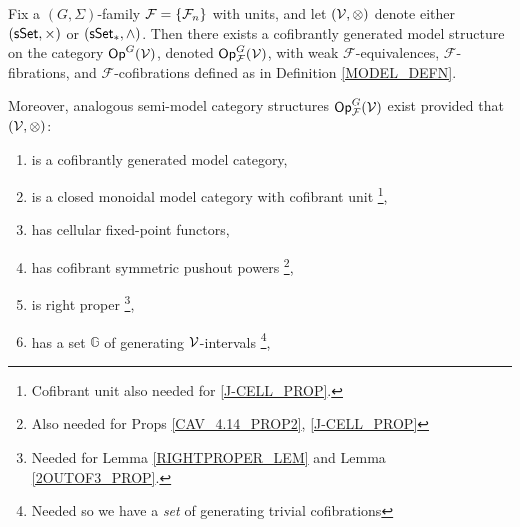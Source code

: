 \documentclass[a4paper,10pt
,draft
]{article}%
\renewcommand{\F}{\mathcal F}
\renewcommand{\1}{\eta}%
\begin{document}
\begin{theorem}
      \label{MODEL_THM}
      Fix a $(G, \Sigma)$-family $\F = \set{\F_n}$ with units,
      and let $(\mathcal V, \otimes)$ denote either $(\mathsf{sSet}, \times)$ or $(\sSet_{\**}, \wedge)$.
      Then there exists a cofibrantly generated model structure on the category $\mathsf{Op}^G(\mathcal V)$,
      denoted $\Op^G_\F(\V)$, with
      weak $\F$-equivalences, $\F$-fibrations, and $\F$-cofibrations defined as in Definition \ref{MODEL_DEFN}.
           
      Moreover, analogous semi-model category structures $\Op^G_\F(\V)$ exist
      provided that $(\mathcal V, \otimes)$:
      \begin{enumerate}[label = (\roman*)]\itemsep-4pt
      \item is a cofibrantly generated model category,
      \item is a closed monoidal model category with cofibrant unit
            \footnote{Cofibrant unit also needed for \ref{J-CELL_PROP}.},
      \item has cellular fixed-point functors,
      \item \label{CSPP_LBL} has cofibrant symmetric pushout powers %
            \footnote{Also needed for Props \ref{CAV_4.14_PROP2}, \ref{J-CELL_PROP}}, %
      \item \label{RP_LBL} is right proper
            \footnote{Needed for Lemma \ref{RIGHTPROPER_LEM} and Lemma \ref{2OUTOF3_PROP}.},
      \item \label{GENSET_LBL} has a set $\mathbb{G}$ of generating $\mathcal V$-intervals
            \footnote{Needed so we have a \textit{set} of generating trivial cofibrations},
      \end{enumerate}
\end{theorem}
\end{document}
